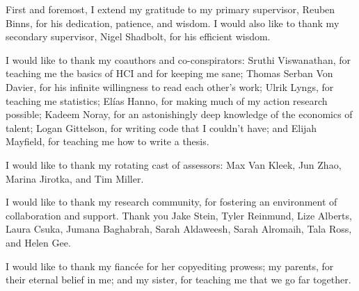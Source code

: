 First and foremost, I extend my gratitude to my primary supervisor, Reuben Binns, for his dedication, patience, and wisdom. I would also like to thank my secondary supervisor, Nigel Shadbolt, for his efficient wisdom.

I would like to thank my coauthors and co-conspirators: Sruthi Viswanathan, for teaching me the basics of HCI and for keeping me sane; Thomas Serban Von Davier, for his infinite willingness to read each other's work; Ulrik Lyngs, for teaching me statistics; Elías Hanno, for making much of my action research possible; Kadeem Noray, for an astonishingly deep knowledge of the economics of talent; Logan Gittelson, for writing code that I couldn't have; and Elijah Mayfield, for teaching me how to write a thesis.

I would like to thank my rotating cast of assessors: Max Van Kleek, Jun Zhao, Marina Jirotka, and Tim Miller.

I would like to thank my research community, for fostering an environment of collaboration and support. Thank you Jake Stein, Tyler Reinmund, Lize Alberts, Laura Csuka, Jumana Baghabrah, Sarah Aldaweesh, Sarah Alromaih, Tala Ross, and Helen Gee.

I would like to thank my fiancée for her copyediting prowess; my parents, for their eternal belief in me; and my sister, for teaching me that we go far together.